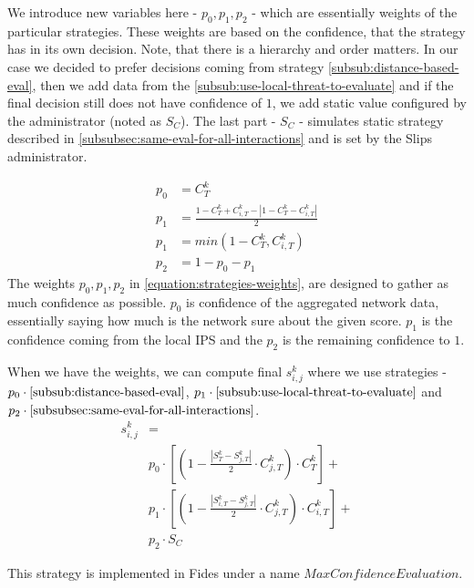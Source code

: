 We introduce new variables here - $p_{0}, p_{1}, p_{2}$ - which are essentially weights of the particular strategies. These weights are based on the confidence, that the strategy has in its own decision.
Note, that there is a hierarchy and order matters. 
In our case we decided to prefer decisions coming from strategy \ref{subsub:distance-based-eval}, then we add data from the \ref{subsub:use-local-threat-to-evaluate} and if the final decision still does not have confidence of $1$, we add static value configured by the administrator (noted as $S_{C}$). 
The last part - $S_{C}$ - simulates static strategy described in \ref{subsubsec:same-eval-for-all-interactions} and is set by the Slips administrator.

\begin{equation}
\label{equation:strategies-weights}
\begin{split}
    p_{0} &= {C}^{k}_{T} \\
    p_{1} &= \frac{1 - {C}^{k}_{T} + {C}^{k}_{i, T} - |1 - {C}^{k}_{T} - {C}^{k}_{i, T}|}{2} \\
    p_{1} &= min(1 - {C}^{k}_{T}, {C}^{k}_{i, T}) \\
    p_{2} &= 1 - p_{0} - p_{1}
\end{split}
\end{equation}
The weights $p_{0}, p_{1}, p_{2}$ in \ref{equation:strategies-weights}, are designed to gather as much confidence as possible. $p_{0}$ is confidence of the aggregated network data, essentially saying how much is the network sure about the given score. 
$p_{1}$ is the confidence coming from the local IPS and the $p_{2}$ is the remaining confidence to $1$.

When we have the weights, we can compute final $s^{k}_{i, j}$ where we use strategies - $p_{0} \cdot \ref{subsub:distance-based-eval}$, $p_{1} \cdot \ref{subsub:use-local-threat-to-evaluate}$ and $p_{2} \cdot \ref{subsubsec:same-eval-for-all-interactions}$. 
\begin{equation}
\begin{split}
    s^{k}_{i, j} &= \\
    &p_{0} \cdot \left[\left(1 - \frac{|{S}^{k}_{T} - S^{k}_{j, T}|}{2} \cdot C^{k}_{j, T}\right) \cdot C^{k}_{T}\right] + \\
    &p_{1} \cdot \left[\left(1 - \frac{|{S}^{k}_{i, T} - S^{k}_{j, T}|}{2} \cdot C^{k}_{j, T}\right) \cdot C^{k}_{i, T}\right] + \\
    &p_{2} \cdot S_{C}
\end{split}
\end{equation}

\noindent
This strategy is implemented in Fides under a name $MaxConfidenceEvaluation$.
